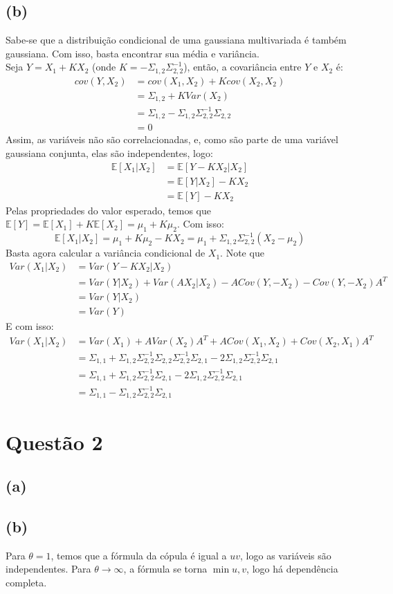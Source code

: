 \documentclass[12pt]{article}
\begin{document}
\subsection*{(b)}
Sabe-se que a distribuição condicional de uma gaussiana multivariada é também gaussiana. Com isso, basta encontrar sua média e variância.\\
Seja $Y=X_{1}+KX_{2}$ (onde $K=-\Sigma_{1,2}\Sigma_{2,2}^{-1}$), então, a covariância entre $Y$ e $X_{2}$ é:
\begin{align*}
cov(Y,X_{2})&=cov(X_{1},X_{2})+Kcov(X_{2},X_{2})\\
&=\Sigma_{1,2}+KVar(X_{2})\\
&=\Sigma_{1,2}-\Sigma_{1,2}\Sigma_{2,2}^{-1}\Sigma_{2,2}\\
&=0
\end{align*}
Assim, as variáveis não são correlacionadas, e, como são parte de uma variável gaussiana conjunta, elas são independentes, logo:
\begin{align*}
\mathbb{E}[X_{1}|X_{2}]&=\mathbb{E}[Y-KX_{2}|X_{2}]\\
&=\mathbb{E}[Y|X_{2}]-KX_{2}\\
&=\mathbb{E}[Y]-KX_{2}
\end{align*}
Pelas propriedades do valor esperado, temos que $\mathbb{E}[Y]=\mathbb{E}[X_{1}]+K\mathbb{E}[X_{2}]=\mu_{1}+K\mu_{2}$. Com isso:
\begin{equation*}
\mathbb{E}[X_{1}|X_{2}]=\mu_{1}+K\mu_{2}-KX_{2}=\mu_{1}+\Sigma_{1,2}\Sigma_{2,2}^{-1}(X_{2}-\mu_{2})
\end{equation*}
Basta agora calcular a variância condicional de $X_{1}$. Note que
\begin{align*}
Var(X_{1}|X_{2})&=Var(Y-KX_{2}|X_{2})\\
&=Var(Y|X_{2})+Var(AX_{2}|X_{2})-ACov(Y,-X_{2})-Cov(Y,-X_{2})A^T\\
&=Var(Y|X_{2})\\
&=Var(Y)
\end{align*}
E com isso:
\begin{align*}
Var(X_{1}|X_{2})&=Var(X_{1})+AVar(X_{2})A^{T}+ACov(X_{1},X_{2})+Cov(X_{2},X_{1})A^{T}\\
&=\Sigma_{1,1}+\Sigma_{1,2}\Sigma_{2,2}^{-1}\Sigma_{2,2}\Sigma_{2,2}^{-1}\Sigma_{2,1}-2\Sigma_{1,2}\Sigma_{2,2}^{-1}\Sigma_{2,1}\\
&=\Sigma_{1,1}+\Sigma_{1,2}\Sigma_{2,2}^{-1}\Sigma_{2,1}-2\Sigma_{1,2}\Sigma_{2,2}^{-1}\Sigma_{2,1}\\
&=\Sigma_{1,1}-\Sigma_{1,2}\Sigma_{2,2}^{-1}\Sigma_{2,1}
\end{align*}

\section*{Questão 2}

\subsection*{(a)}

\subsection*{(b)}
Para $\theta=1$, temos que a fórmula da cópula é igual a $uv$, logo as variáveis são independentes. Para  $\theta \rightarrow \infty$, a fórmula se torna $\min{u,v}$, logo há dependência completa.
\end{document}
